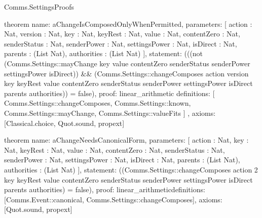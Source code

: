 \begin{lexlean}{Comms.SettingsProofs}
\begin{semanticmodule}
theorem{
  name: aChangeIsComposedOnlyWhenPermitted,
  parameters: [
    action : Nat,
    version : Nat,
    key : Nat,
    keyRest : Nat,
    value : Nat,
    contentZero : Nat,
    senderStatus : Nat,
    senderPower : Nat,
    settingsPower : Nat,
    isDirect : Nat,
    parents : (List Nat),
    authorities : (List Nat)
  ],
  statement: (((not (Comms.Settings::mayChange key value contentZero senderStatus senderPower settingsPower isDirect)) && (Comms.Settings::changeComposes action version key keyRest value contentZero senderStatus senderPower settingsPower isDirect parents authorities)) = false),
  proof: linear_arithmetic{
    definitions: [
      Comms.Settings::changeComposes,
      Comms.Settings::known,
      Comms.Settings::mayChange,
      Comms.Settings::valueFits
    ]
  },
  axioms: [Classical.choice, Quot.sound, propext]
}

theorem{
  name: aChangeNeedsCanonicalForm,
  parameters: [
    action : Nat,
    key : Nat,
    keyRest : Nat,
    value : Nat,
    contentZero : Nat,
    senderStatus : Nat,
    senderPower : Nat,
    settingsPower : Nat,
    isDirect : Nat,
    parents : (List Nat),
    authorities : (List Nat)
  ],
  statement: ((Comms.Settings::changeComposes action 2 key keyRest value contentZero senderStatus senderPower settingsPower isDirect parents authorities) = false),
  proof: linear_arithmetic{definitions: [Comms.Event::canonical, Comms.Settings::changeComposes]},
  axioms: [Quot.sound, propext]
}
\end{semanticmodule}
\end{lexlean}
